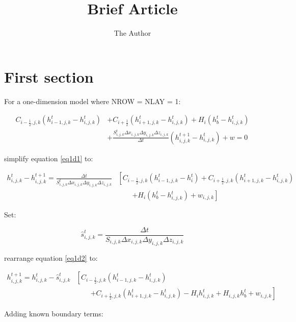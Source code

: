 \documentclass[11pt]{article} %
\title{Brief Article}
\author{The Author}
\begin{document}
\maketitle

\section{First section}

For a one-dimension model where NROW = NLAY = 1:

\begin{align}  
C_{i-\frac{1}{2},j,k} \left( h^t_{i-1,j,k} - h^t_{i,j,k} \right) &+ C_{i+\frac{1}{2}} \left( h^t_{i+1,j,k} - h^t_{i,j,k} \right) + H_{i}\left( h^{t}_{b} - h^{t}_{i,j,k} \right) \nonumber \label{eq1d1}\\ &+ \frac{S^{t}_{i,j,k} \Delta x_{i,j,k} \Delta y_{i,j,k} \Delta z_{i,j,k}}{\Delta t} \left( h^{t+1}_{i,j,k} - h^t_{i,j,k} \right) + w = 0
\end{align}

\noindent simplify equation \ref{eq1d1} to:

\begin{align}
h^t_{i,j,k} - h^{t+1}_{i,j,k} = \frac{\Delta t}{S^{t}_{i,j,k} \Delta x_{i,j,k} \Delta y_{i,j,k} \Delta z_{i,j,k}} &\left[ C_{i-\frac{1}{2},j,k} \left( h^t_{i-1,j,k} - h^t_i \right) + C_{i+\frac{1}{2},j,k} \left( h^t_{i+1,j,k} - h^t_{i,j,k} \right) \right.\nonumber  \label{eq1d2} \\ &\qquad \left.+ H_{i}\left( h^{t}_{b} - h^{t}_{i,j,k} \right) + w_{i,j,k} \right] 
\end{align}

\noindent Set:

\begin{equation} \label{eqnTS}
\hat{s}^{t}_{i,j,k} = \frac{\Delta t}{S_{i,j,k} \Delta x_{i,j,k} \Delta y_{i,j,k} \Delta z_{i,j,k}}
\end{equation}


\noindent rearrange equation \ref{eq1d2} to:

\begin{align}
h^{t+1}_{i,j,k} = h^t_{i,j,k} - \hat{s}^{t}_{i,j,k} &\left[ C_{i-\frac{1}{2},j,k} \left( h^t_{i-1,j,k} - h^t_{i,j,k} \right) \right.\nonumber  \label{eq1d3} \\ &\qquad \left.+ C_{i+\frac{1}{2},j,k} \left( h^t_{i+1,j,k} - h^t_{i,j,k} \right) - H_{i} h^{t}_{i,j,k} +  H_{i,j,k} h^{t}_{b} + w_{i,j,k} \right] 
\end{align}

Adding known boundary terms:
\end{document}

